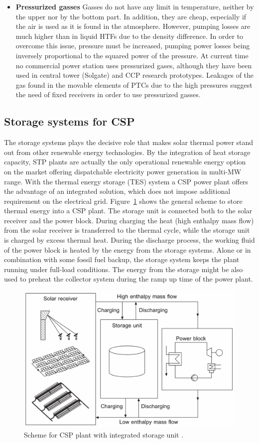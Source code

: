 \begin{itemize}
\item \textbf{Pressurized gasses} Gasses do not have any limit in temperature, neither by the upper nor by the bottom part. In addition, they are cheap, especially if the air is used as it is found in the atmosphere. However, pumping losses are much higher than in liquid HTFs due to the density difference. In order to overcome this issue, pressure must be increased, pumping power losses being inversely proportional to the squared power of the pressure. At current time no commercial power station uses pressurized gases, although they have been used in central tower (Solgate) and CCP research prototypes. Leakages of the gas found in the movable elements of PTCs due to the high pressures suggest the need of fixed receivers in order to use pressurized gasses.
\end{itemize}
\subsection{Storage systems for CSP}\label{Subsection_storage_system}
The storage systems plays the decisive role that makes solar thermal power stand out from other renewable energy technologies. By the integration of heat storage capacity, STP plants are actually the only operational renewable energy option on the market offering dispatchable electricity power generation in multi-MW range. With the thermal energy storage (TES) system a CSP power plant offers the advantage of an integrated solution, which does not impose additional requirement on the electrical grid. Figure~\ref{integratedstoragescheme} shows the general scheme to store thermal energy into a CSP plant. The storage unit is connected both to the solar receiver and the power block. During charging the heat (high enthalpy mass flow) from the solar receiver is transferred to the thermal cycle, while the storage unit is charged by excess thermal heat. During the discharge process, the working fluid of the power block is heated by the energy from the  storage systems. Alone or in combination with some fossil fuel backup, the storage system keeps the plant running under full-load conditions. The energy from the storage might be also used to preheat the collector system during the ramp up time of the power plant.
\begin{figure}[h] 
\centering
\includegraphics[width=0.70\linewidth]{FIG/integratedstoragescheme}
\caption[Scheme for CSP plant with integrated storage unit.]{Scheme for CSP plant with integrated storage unit \cite{Steinmann2015}.}\label{integratedstoragescheme}
\end{figure}
